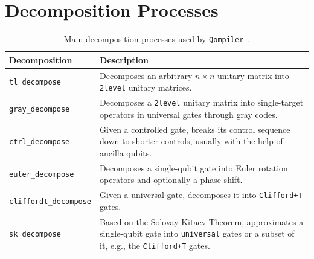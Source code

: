 \documentclass[a4paper,titlepage]{article}
\begin{document}
    \section{Decomposition Processes}\label{sec:decomp}

    \begin{table}[tbhp]
        \centering
        \caption{Main decomposition processes used by \texttt{Qompiler}~\cite{nielsen2010q,dawson2005sk}.}
        \begin{tabularx}{.9\textwidth}{l|X}
            \hline
            \textbf{Decomposition}        & \textbf{Description}                                                                                                                                        \\
            \hline
            \texttt{tl\_decompose}        & Decomposes an arbitrary $n \times n$ unitary matrix into \texttt{2level} unitary matrices.                                                                  \\
            \texttt{gray\_decompose}      & Decomposes a \texttt{2level} unitary matrix into single-target operators in universal gates through gray codes.                                                                \\
            \texttt{ctrl\_decompose}      & Given a controlled gate, breaks its control sequence down to shorter controls, usually with the help of ancilla qubits.                                     \\
            \texttt{euler\_decompose}     & Decomposes a single-qubit gate into Euler rotation operators and optionally a phase shift.                                                                  \\
            \texttt{cliffordt\_decompose} & Given a universal gate, decomposes it into \texttt{Clifford+T} gates.                                                                                       \\
            \texttt{sk\_decompose}        & Based on the Solovay-Kitaev Theorem, approximates a single-qubit gate into \texttt{universal} gates or a subset of it, e.g., the \texttt{Clifford+T} gates. \\
            \hline
        \end{tabularx}
        \label{tab:decomp}
    \end{table}


\end{document}
